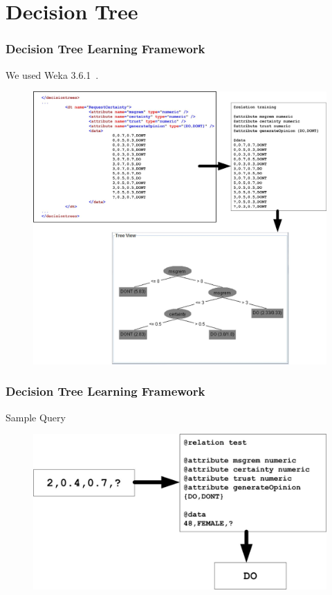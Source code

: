 \section{Decision Tree}
\begin{frame}
\frametitle{Decision Tree Learning Framework}

We used Weka 3.6.1~\citep*{weka}.

\begin{figure}
\centering
\includegraphics[height=0.75\textheight]{images/xml2dtxtra.jpg}
\end{figure}

\end{frame}

\begin{frame}
\frametitle{Decision Tree Learning Framework}

Sample Query

\begin{figure}
\centering
\includegraphics[width=1\textwidth]{images/xml2dttest.jpg}
\end{figure}

\end{frame}